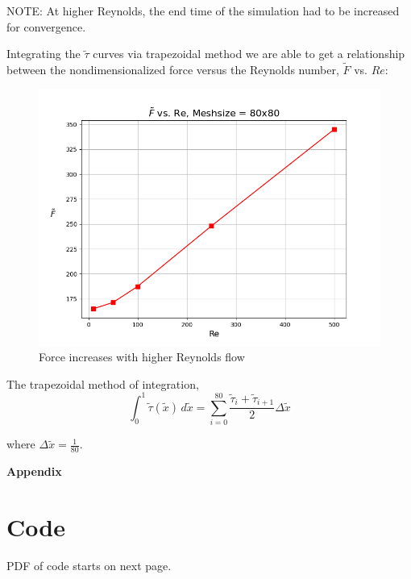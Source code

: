 \documentclass[11pt]{article}
\begin{document}
NOTE: At higher Reynolds, the end time of the simulation had to be increased for convergence.
\vspace{3.5mm}

Integrating the $\tilde{\tau}$ curves via trapezoidal method we are able to get a relationship between the nondimensionalized force versus the Reynolds number, $\tilde{F}$ vs. $Re$:

\begin{figure}[H]
   \centering
   \includegraphics[width = \textwidth]{images/Nondimensional_Force_vs._Re.png}
   \caption{Force increases with higher Reynolds flow}
   \label{force}
\end{figure}

The trapezoidal method of integration,
\begin{equation*}
   \displaystyle \int_{0}^{1} \tilde{\tau}(\tilde{x})\, d\tilde{x} = \sum_{i=0}^{80} \dfrac{\tilde{\tau}_{i}+\tilde{\tau}_{i+1}}{2} \Delta{\tilde{x}}
\end{equation*}

where $\Delta{\tilde{x}} = \frac{1}{80}$.


\pagebreak
\appendix
{} 
\begin{center}
\vspace*{\fill}
   \Huge \bf Appendix 
\vspace*{\fill}
\end{center}
\pagebreak 

\hypertarget{code}{}
\section{Code}
PDF of code starts on next page.


\end{document}
